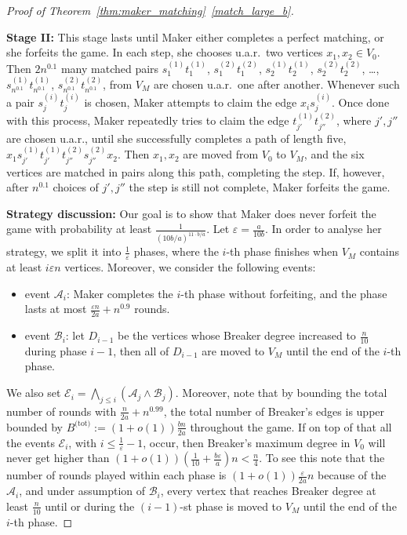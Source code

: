 \documentclass[11pt, a4paper]{article}
\numberwithin{equation}{section}
\numberwithin{figure}{section}
\newcommand{\eps}{\varepsilon}
\begin{document}
\begin{proof}[Proof of Theorem~\ref{thm:maker_matching}~\ref{match_large_b}]
\begin{enumerate}
\end{enumerate}

\textbf{Stage II:} This stage lasts until Maker either completes a perfect matching, or she forfeits the game. In each step, she chooses u.a.r.~two vertices $x_1, x_2\in V_0$. Then $2n^{0.1}$ many matched pairs $s^{(1)}_1 t^{(1)}_1$, $s^{(2)}_1 t^{(2)}_1$, $s^{(1)}_2 t^{(1)}_2$, $s^{(2)}_2 t^{(2)}_2$, \dots, $s^{(1)}_{n^{0.1}} t^{(1)}_{n^{0.1}}$, $s^{(2)}_{n^{0.1}} t^{(2)}_{n^{0.1}}$,  from $V_M$ are chosen u.a.r.~one after another. Whenever such a pair $s^{(i)}_j t^{(i)}_j$ is chosen, Maker attempts to claim the edge $x_i s^{(i)}_j$. Once done with this process, Maker repeatedly tries to claim the edge $t^{(1)}_{j'} t^{(2)}_{j''}$, where $j', j''$ are chosen u.a.r., until she successfully completes a path of length five, $x_1 s^{(1)}_{j'} t^{(1)}_{j'} t^{(2)}_{j''}s^{(2)}_{j''} x_2$. Then $x_1, x_2$ are moved from $V_0$ to $V_M$, and the six vertices are matched in pairs along this path, completing the step. If, however, after $n^{0.1}$ choices of $j', j''$ the step is still not complete, Maker forfeits the game.

\medskip

\textbf{Strategy discussion:}
Our goal is to show that Maker does never forfeit the game with probability at least 
$\frac{1}{(10b/a)^{11\cdot b/a}}$.
Let $\varepsilon = \frac{a}{10b}$.
In order to analyse her strategy, 
we split it into
$\frac{1}{\eps}$ phases, where the 
$i$-th phase finishes when $V_M$ contains at least $i\eps n$ vertices.
Moreover,
we consider the following events:
\begin{itemize}
\item event $\mathcal{A}_i$: Maker completes the $i$-th phase without forfeiting, and the phase lasts at most $\frac{\eps n}{2a} + n^{0.9}$ rounds. 
\item event $\mathcal{B}_i$: 
let $D_{i-1}$ be the vertices
whose Breaker degree increased to $\frac{n}{10}$ during phase $i-1$, then all of $D_{i-1}$ are moved to $V_M$ until the end of the $i$-th phase.
\end{itemize}

We also set $\mathcal{E}_i = \bigwedge_{j \leq i} (\mathcal{A}_j \land \mathcal{B}_j)$. 
Moreover, note that by bounding the total number of rounds with
$\frac{n}{2a} + n^{0.99}$, the total number of Breaker's edges is upper bounded by $B^{\text{(tot)}}:=(1 + o(1))\frac{bn}{2a}$ throughout the game.
If on top of that all the events $\mathcal{E}_i$, with $i \leq \frac{1}{\eps}-1$, occur, then Breaker's maximum degree in $V_0$ will never get higher than 
$(1+o(1))(\frac{1}{10} + \frac{b\eps}{a}) n < \frac{n}{4}$. To see this note that the number of rounds played within each phase is $(1+o(1))\frac{\eps}{2a} n$ because of the $\mathcal{A}_i$, and under assumption of $\mathcal{B}_i$, every vertex that reaches Breaker degree at least $\frac{n}{10}$ until or during the $(i-1)$-st phase 
is moved to $V_M$ until the end of the $i$-th phase.


\end{proof}
\end{document}
